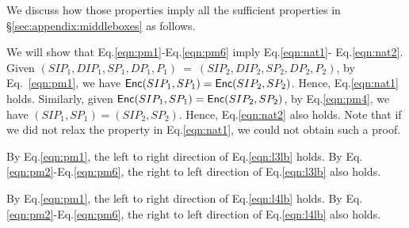 We discuss how those properties imply all the sufficient properties in \S\ref{sec:appendix:middleboxes} as follows.

We will show that Eq.\eqref{eqn:pm1}-Eq.\eqref{eqn:pm6} imply Eq.\eqref{eqn:nat1}-
Eq.\eqref{eqn:nat2}. Given $(SIP_1, DIP_1, SP_1, DP_1, P_1)\ =\ (SIP_2, DIP_2, SP_2, DP_2, P_2)$, 
by Eq.~\eqref{eqn:pm1},
we have $\mathsf{Enc}(SIP_1, SP_1) = \mathsf{Enc}(SIP_2, SP_2)$. Hence, Eq.\eqref{eqn:nat1} holds. Similarly, 
given $\mathsf{Enc}(SIP_1, SP_1) = \mathsf{Enc}(SIP_2, SP_2)$, by Eq.\eqref{eqn:pm4}, 
we have $(SIP_1, SP_1) = (SIP_2, SP_2)$. Hence, Eq.\eqref{eqn:nat2} also holds. Note that if
we did not relax the property in Eq.\eqref{eqn:nat1}, we could not obtain such a proof.

By Eq.\eqref{eqn:pm1}, the left to right direction of 
Eq.\eqref{eqn:l3lb} holds. By Eq.\eqref{eqn:pm2}-Eq.\eqref{eqn:pm6}, the right to left 
direction of Eq.\eqref{eqn:l3lb} also holds.

By Eq.\eqref{eqn:pm1}, the left to right direction of 
Eq.\eqref{eqn:l4lb} holds. By Eq.\eqref{eqn:pm2}-Eq.\eqref{eqn:pm6}, the right to left 
direction of Eq.\eqref{eqn:l4lb} also holds.




